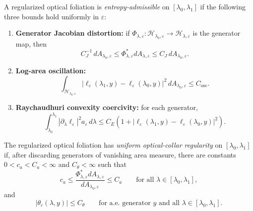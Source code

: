 \begin{definition}\label{def:EntropyAdmissibleOpticalFoliation}
A regularized optical foliation is \emph{entropy-admissible} on $[\lambda_0,\lambda_1]$ if the following three bounds hold uniformly in $\varepsilon$:
\begin{enumerate}
    \item \textbf{Generator Jacobian distortion:} if $\Phi_{\lambda,\varepsilon}:\mathcal H_{\lambda_0,\varepsilon}\to\mathcal H_{\lambda,\varepsilon}$ is the generator map, then
    \[
        C_J^{-1}\,dA_{\lambda_0,\varepsilon}
        \le
        \Phi_{\lambda,\varepsilon}^*dA_{\lambda,\varepsilon}
        \le
        C_J\,dA_{\lambda_0,\varepsilon}.
    \]
    \item \textbf{Log-area oscillation:}
    \[
        \int_{\mathcal H_{\lambda_0,\varepsilon}}
        |\ell_\varepsilon(\lambda_1,y)-\ell_\varepsilon(\lambda_0,y)|^2
        \,dA_{\lambda_0,\varepsilon}
        \le C_{\mathrm{osc}}.
    \]
    \item \textbf{Raychaudhuri convexity coercivity:} for each generator,
    \begin{equation}\label{eq:RaychaudhuriCoercivityEntropy}
        \int_{\lambda_0}^{\lambda_1}
        |\partial_\lambda\ell_\varepsilon|^2
        a_\varepsilon\,d\lambda
        \le
        C_E\left(
        1+
        |\ell_\varepsilon(\lambda_1,y)-\ell_\varepsilon(\lambda_0,y)|^2
        \right).
    \end{equation}
\end{enumerate}
\end{definition}

\begin{definition}\label{def:UniformOpticalCollarRegularity}
The regularized optical foliation has \emph{uniform optical-collar regularity} on $[\lambda_0,\lambda_1]$ if, after discarding generators of vanishing area measure, there are constants $0<c_a<C_a<\infty$ and $C_\theta<\infty$ such that
\begin{equation}\label{eq:OpticalCollarAreaBounds}
    c_a\le
    \frac{\Phi_{\lambda,\varepsilon}^*dA_{\lambda,\varepsilon}}
         {dA_{\lambda_0,\varepsilon}}
    \le C_a
    \qquad
    \text{for all }\lambda\in[\lambda_0,\lambda_1],
\end{equation}
and
\begin{equation}\label{eq:OpticalCollarExpansionBound}
    |\theta_\varepsilon(\lambda,y)|\le C_\theta
    \qquad
    \text{for a.e. generator }y\text{ and all }\lambda\in[\lambda_0,\lambda_1].
\end{equation}
\end{definition}

